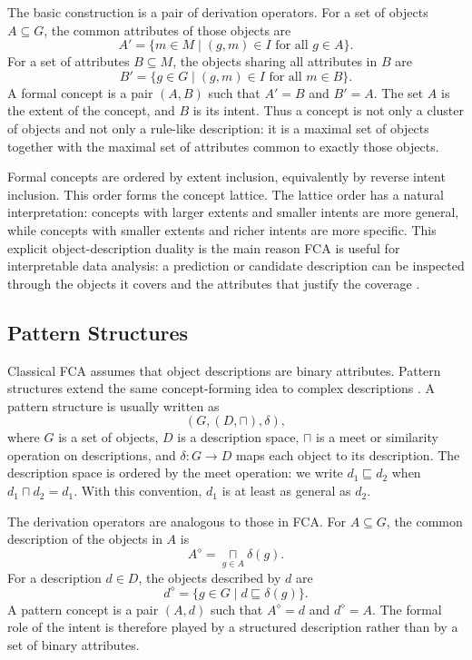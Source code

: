 \documentclass[11pt]{article}
\begin{document}
The basic construction is a pair of derivation operators. For a set of objects
$A \subseteq G$, the common attributes of those objects are
\[
    A' = \{m \in M \mid (g,m) \in I \text{ for all } g \in A\}.
\]
For a set of attributes $B \subseteq M$, the objects sharing all attributes in
$B$ are
\[
    B' = \{g \in G \mid (g,m) \in I \text{ for all } m \in B\}.
\]
A formal concept is a pair $(A,B)$ such that $A'=B$ and $B'=A$. The set
$A$ is the extent of the concept, and $B$ is its intent. Thus a concept is not
only a cluster of objects and not only a rule-like description: it is a maximal
set of objects together with the maximal set of attributes common to exactly
those objects.

Formal concepts are ordered by extent inclusion, equivalently by reverse intent
inclusion. This order forms the concept lattice. The lattice order has a
natural interpretation: concepts with larger extents and smaller intents are
more general, while concepts with smaller extents and richer intents are more
specific. This explicit object-description duality is the main reason FCA is
useful for interpretable data analysis: a prediction or candidate description can be
inspected through the objects it covers and the attributes that justify the
coverage \cite{carpineto2004concept,ignatov2014introduction}.

\subsection{Pattern Structures}

Classical FCA assumes that object descriptions are binary attributes. Pattern
structures extend the same concept-forming idea to complex descriptions
\cite{ganter2001pattern,kuznetsov2009pattern}. A pattern structure is usually
written as
\[
    (G,(D,\sqcap),\delta),
\]
where $G$ is a set of objects, $D$ is a description space, $\sqcap$ is a meet
or similarity operation on descriptions, and $\delta:G \to D$ maps each object
to its description. The description space is ordered by the meet operation:
we write $d_1 \sqsubseteq d_2$ when $d_1 \sqcap d_2 = d_1$. With this
convention, $d_1$ is at least as general as $d_2$.

The derivation operators are analogous to those in FCA. For
$A \subseteq G$, the common description of the objects in $A$ is
\[
    A^{\diamond} = \mathop{\sqcap}\limits_{g \in A} \delta(g).
\]
For a description $d \in D$, the objects described by $d$ are
\[
    d^{\diamond} = \{g \in G \mid d \sqsubseteq \delta(g)\}.
\]
A pattern concept is a pair $(A,d)$ such that $A^{\diamond}=d$ and
$d^{\diamond}=A$. The formal role of the intent is therefore played by a
structured description rather than by a set of binary attributes.
\end{document}
